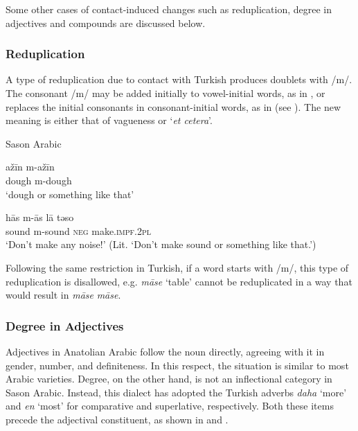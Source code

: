 \documentclass[output=paper]{langsci/langscibook}
\begin{document}
Some other cases of contact-induced changes such as reduplication, degree in adjectives and compounds are discussed below.



\subsubsection{Reduplication}

A type of reduplication due to contact with Turkish produces doublets with /m/. The consonant /m/ may be added initially to vowel-initial words, as in , or replaces the initial consonants in consonant-initial words, as in  (see \citealt{Akkus2017,Lahdo2009}). The new meaning is either that of vagueness or `\textit{et cetera}'.

\begin{exe}
\ex \label{redup} Sason Arabic
		\begin{xlist}
		\ex \label{redup1}\gll a\v{z}\={i}n m-a\v{z}\={i}n\\
        dough m-dough\\
        \glt `dough or something like that'


	\ex \label{redup2} \gll h\={a}s m-\={a}s l\={a} təso \\
        sound m-sound \textsc{neg} make.\textsc{impf.2pl}\\
        \glt `Don't make any noise!' (Lit. `Don't make sound or something like that.') %
		\end{xlist}
\end{exe}

\noindent Following the same restriction in Turkish, if a word starts with /m/, this type of reduplication is disallowed, e.g. \textit{m\={a}se} `table' cannot be reduplicated in a way that would result in \textit{m\={a}se} \textit{m\={a}se}. 


\subsubsection{Degree in Adjectives} 
Adjectives in Anatolian Arabic follow the noun directly, agreeing with it in gender, number, and definiteness. In this respect, the situation is similar to most Arabic varieties. Degree, on the other hand, is not an inflectional category in Sason Arabic. Instead, this dialect has adopted the Turkish adverbs \textit{daha} `more' and \textit{en} `most' for comparative and superlative, respectively. Both these items precede the adjectival constituent, as shown in  and .
\end{document}
